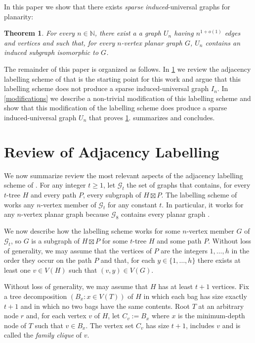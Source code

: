 \documentclass{patmorin}
\newcommand{\N}{\mathbb{N}}
\newtheorem{theorem}{Theorem}
\begin{document}
In this paper we show that there exists \emph{sparse} \emph{induced}-universal graphs for planarity:

\begin{theorem}\label{main-planar}
    For every $n\in\N$, there exist a a graph $U_n$ having $n^{1+o(1)}$ edges and vertices and such that, for every $n$-vertex planar graph $G$, $U_n$ contains an induced subgraph isomorphic to $G$.
\end{theorem}

The remainder of this paper is organized as follows. In \cref{review} we review the adjacency labelling scheme of \cite{dujmovic.esperet.ea:adjacency} that is the starting point for this work and argue that this labelling scheme does not produce a sparse induced-universal graph $I_n$.  In \cref{modifications} we describe a non-trivial modification of this labelling scheme and show that this modification of the labelling scheme does produce a sparse induced-universal graph $U_n$ that proves \cref{main-planar}.   summarizes and concludes.



\section{Review of Adjacency Labelling}
\label{review}

We now summarize review the most relevant aspects of the adjacency labelling scheme of \citet{dujmovic.esperet.ea:adjacency}.  For any integer $t\ge 1$, let $\mathcal{G}_t$ the set of graphs that contains, for every $t$-tree $H$ and every path $P$, every subgraph of $H\boxtimes P$.  The labelling scheme of \citet{dujmovic.esperet.ea:adjacency} works any $n$-vertex member of $\mathcal{G}_t$ for any constant $t$.  In particular, it works for any $n$-vertex planar graph because $\mathcal{G}_8$ contains every planar graph \cite{X}.

We now describe how the labelling scheme works for some $n$-vertex member $G$ of $\mathcal{G}_t$, so $G$ is a subgraph of $H\boxtimes P$ for some $t$-tree $H$ and some path $P$.  Without loss of generality, we may assume that the vertices of $P$ are the integers $1,\ldots,h$ in the order they occur on the path $P$ and that, for each $y\in\{1,\ldots,h\}$ there exists at least one $v\in V(H)$ such that $(v,y)\in V(G)$.

Without loss of generality, we may assume that $H$ has at least $t+1$ vertices. Fix a tree decomposition $(B_x:x\in V(T))$ of $H$ in which each bag has size exactly $t+1$ and in which no two bags have the same contents.  Root $T$ at an arbitrary node $r$ and, for each vertex $v$ of $H$, let $C_v:=B_x$ where $x$ is the minimum-depth node of $T$ such that $v\in B_x$.  The vertex set $C_v$ has size $t+1$, includes $v$ and is called the \emph{family clique} of $v$.
\end{document}
